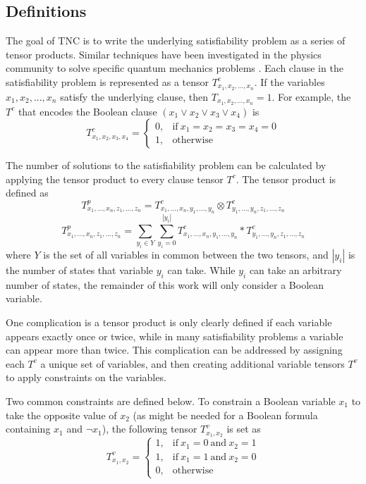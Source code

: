 \hypertarget{definitions}{%
\subsection{Definitions}\label{definitions}}

The goal of TNC is to write the underlying satisfiability problem as a series of tensor products. Similar techniques have been investigated in the physics community to solve specific quantum mechanics problems \cite{pan2020contracting} \cite{biamonte2019lectures}. Each clause in the satisfiability problem is represented as a tensor \(T^c_{x_1,x_2,...,x_n}\). If the variables \(x_1,x_2,...,x_n\) satisfy the underlying clause, then \(T_{x_1,x_2,...,x_n}=1\). For example, the \(T^c\) that encodes the Boolean clause \((x_1 \lor x_2 \lor x_3 \lor x_4)\) is \begin{equation*}
T^c_{x_1,x_2,x_3,x_4}=
\begin{cases}
  0, & \text{if}\ x_1=x_2=x_3=x_4=0 \\
  1, & \text{otherwise}
\end{cases}
\end{equation*}

The number of solutions to the satisfiability problem can be calculated by applying the tensor product to every clause tensor \(T^c\). The tensor product is defined as \[T^p_{x_1,...,x_n,z_1,...,z_n}=T^c_{x_1,...,x_n,y_1,...,y_n} \otimes T^c_{y_1,...,y_n,z_1,...,z_n}\] \ten \[T^p_{x_1,...,x_n,z_1,...,z_n}=\sum_{y_i \in Y} \sum_{y_i=0}^{|y_i|} T^c_{x_1,...,x_n,y_1,...,y_n} * T^c_{y_1,...,y_n,z_1,...,z_n}\] \normalsize where \(Y\) is the set of all variables in common between the two tensors, and \(|y_i|\) is the number of states that variable \(y_i\) can take. While \(y_i\) can take an arbitrary number of states, the remainder of this work will only consider a Boolean variable.

One complication is a tensor product is only clearly defined if each variable appears exactly once or twice, while in many satisfiability problems a variable can appear more than twice. This complication can be addressed by assigning each \(T^c\) a unique set of variables, and then creating additional variable tensors \(T^v\) to apply constraints on the variables.

Two common constraints are defined below. To constrain a Boolean variable \(x_1\) to take the opposite value of \(x_2\) (as might be needed for a Boolean formula containing \(x_1\) and \(\neg x_1\)), the following tensor \(T^v_{x_1,x_2}\) is set as \begin{equation*}
T^v_{x_1,x_2}=
\begin{cases}
  1, & \text{if}\ x_1=0\ \text{and}\ x_2=1\\
  1, & \text{if}\ x_1=1\ \text{and}\ x_2=0\\
  0, & \text{otherwise}
\end{cases}
\end{equation*}

